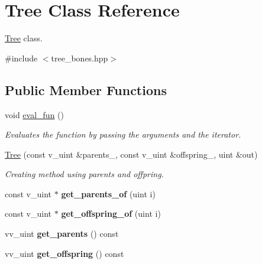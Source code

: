 \hypertarget{classTree}{}\section{Tree Class Reference}
\label{classTree}


\hyperlink{classTree}{Tree} class.  




{\ttfamily \#include $<$tree\+\_\+bones.\+hpp$>$}

\subsection*{Public Member Functions}
\begin{DoxyCompactItemize}
\item 
void \hyperlink{classTree_a5a24565d179a3bd6edae1ff323060a93}{eval\+\_\+fun} ()\hypertarget{classTree_a5a24565d179a3bd6edae1ff323060a93}{}\label{classTree_a5a24565d179a3bd6edae1ff323060a93}

\begin{DoxyCompactList}\small\item\em Evaluates the function by passing the arguments and the iterator. \end{DoxyCompactList}\item 
\hyperlink{classTree_a0f964d9ba9834822d3e18946a5361839}{Tree} (const v\+\_\+uint \&parents\+\_\+, const v\+\_\+uint \&offspring\+\_\+, uint \&out)
\begin{DoxyCompactList}\small\item\em Creating method using parents and offpring. \end{DoxyCompactList}\item 
const v\+\_\+uint $\ast$ {\bfseries get\+\_\+parents\+\_\+of} (uint i)\hypertarget{classTree_adb9bede67bc875b58bb240d4c5421821}{}\label{classTree_adb9bede67bc875b58bb240d4c5421821}

\item 
const v\+\_\+uint $\ast$ {\bfseries get\+\_\+offspring\+\_\+of} (uint i)\hypertarget{classTree_a02c43c8a0bb0e7be7bf33436a8c05b30}{}\label{classTree_a02c43c8a0bb0e7be7bf33436a8c05b30}

\item 
vv\+\_\+uint {\bfseries get\+\_\+parents} () const \hypertarget{classTree_ae4f36e6d306946015965a7d9bc577a2a}{}\label{classTree_ae4f36e6d306946015965a7d9bc577a2a}

\item 
vv\+\_\+uint {\bfseries get\+\_\+offspring} () const \hypertarget{classTree_af8780369e1bc3a0d4e396bb91ad85a72}{}\label{classTree_af8780369e1bc3a0d4e396bb91ad85a72}


\end{DoxyCompactItemize}
